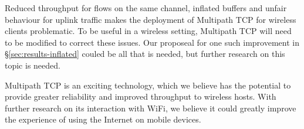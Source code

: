 Reduced throughput
for flows on the same channel, inflated buffers and unfair behaviour for uplink
traffic makes the deployment of Multipath TCP for wireless clients problematic. To be useful in a
wireless setting, Multipath TCP will need to be modified to correct these issues.
Our proposeal for one such improvement in
\S\ref{sec:results-inflated}
couled be all that is needed, but further research on this topic is needed.

Multipath TCP is an exciting technology, which we believe has the potential to 
provide greater reliability and improved throughput to wireless hosts. With
further research on its interaction with WiFi, we believe it could greatly improve the
experience of using the Internet on mobile devices.

